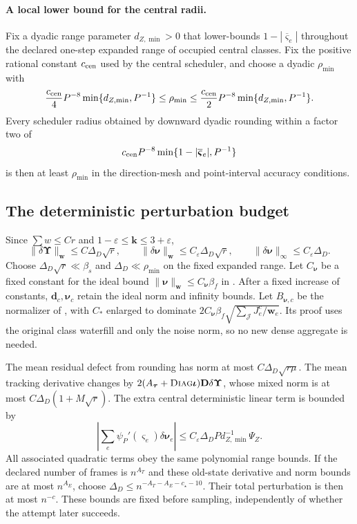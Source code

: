 \documentclass[11pt]{article}
\theoremstyle{remark}
\newcommand{\ttau}{\boldsymbol{\tau}}
\newcommand{\ww}{\mathbf w}
\newcommand{\vvs}{\boldsymbol{\varsigma}}
\newcommand{\vvsbar}{\overline{\boldsymbol{\varsigma}}}
\newcommand{\UUps}{\boldsymbol{\Upsilon}}
\newcommand{\DD}{\mathbf D}
\newcommand{\kk}{\mathbf k}
\newcommand{\dd}{\mathbf d}
\newcommand{\nnu}{\boldsymbol{\nu}}
\newcommand{\iiota}{\boldsymbol{\iota}}
\newcommand{\diag}{\textsc{Diag}}
\newcommand{\norm}[1]{\lVert#1\rVert}
\begin{document}
\paragraph{A local lower bound for the central radii.}
Fix a dyadic range parameter $d_{Z,\min}>0$ that lower-bounds $1-|\vvsbar_e|$
throughout the declared one-step expanded range of occupied central classes.
Fix the positive rational constant $c_{\rm cen}$ used by the central scheduler,
and choose a dyadic $\rho_{\min}$ with
\[
 \frac{c_{\rm cen}}4P^{-8}\min\{d_{Z,\min},P^{-1}\}
 \le\rho_{\min}\le
 \frac{c_{\rm cen}}2P^{-8}\min\{d_{Z,\min},P^{-1}\}.
\]
Every scheduler radius obtained by downward dyadic rounding within a factor two of
\[
c_{\rm cen}P^{-8}\min\{1-|\vvsbar_e|,P^{-1}\}
\]
is then at least $\rho_{\min}$ in
the direction-mesh and point-interval accuracy conditions.

\subsection{The deterministic perturbation budget}

Since $\sum w\le Cr$ and $1-\varepsilon\le \kk\le3+\varepsilon$,
\[
 \norm{\delta \UUps}_{\ww}\le C\Delta_D\sqrt r,\qquad
 \norm{\delta\nnu}_{\ww}\le C_\varepsilon\Delta_D\sqrt r,
 \qquad \norm{\delta\nnu}_\infty\le C_\varepsilon\Delta_D.
\]
Choose $\Delta_D\sqrt r\ll\beta_s$ and $\Delta_D\ll\rho_{\min}$ on the fixed
expanded range.
Let $C_{\nnu}$ be a fixed constant for the ideal bound $\norm{\nnu}_{\ww}\le
C_{\nnu}\beta_f$ in .
After a fixed increase of constants, $\dd_c,\nnu_c$ retain the ideal norm and
infinity bounds.
Let $B_{\nnu,c}$ be the normalizer of , with
$C_*$ enlarged to dominate $2C_{\nnu}\beta_f\sqrt{\sum_{\mathcal J}J^c_e/\ww_e}$.
Its proof uses the original class waterfill and only the noise norm, so no new
dense aggregate is needed.

The mean residual defect from rounding has norm at most $C\Delta_D\sqrt{r\mu}$.
The mean tracking derivative changes by $2(A_{\ttau}+\diag\iiota)\DD\delta \UUps$, whose
mixed norm is at most $C\Delta_D(1+M\sqrt r)$.
The extra central deterministic linear term is bounded by
\[
 \left|\sum_e\psi_P'(\vvs_e)\delta\nnu_e\right|
 \le C_\varepsilon\Delta_D
             P d_{Z,\min}^{-1}\Psi_Z.
\]
All associated quadratic terms obey the same polynomial range bounds.
If the declared number of frames is $n^{A_T}$ and these old-state derivative and
norm bounds are at most $n^{A_E}$, choose $\Delta_D\le n^{-A_T-A_E-c_\star-10}$.
Their total perturbation is then at most $n^{-c}$.
These bounds are fixed before sampling, independently of whether the attempt
later succeeds.
\end{document}
